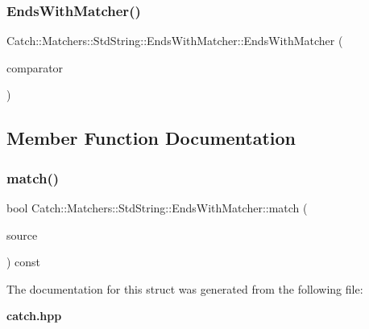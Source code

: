 \subsubsection{EndsWithMatcher()}
{\footnotesize\ttfamily Catch\+::\+Matchers\+::\+Std\+String\+::\+Ends\+With\+Matcher\+::\+Ends\+With\+Matcher (\begin{DoxyParamCaption}\item[{\textbf{ Cased\+String} const \&}]{comparator }\end{DoxyParamCaption})}



\subsection{Member Function Documentation}
\mbox{\label{struct_catch_1_1_matchers_1_1_std_string_1_1_ends_with_matcher_aca2741fa57374a2a98d2a84ac3e13a6d}} 
\subsubsection{match()}
{\footnotesize\ttfamily bool Catch\+::\+Matchers\+::\+Std\+String\+::\+Ends\+With\+Matcher\+::match (\begin{DoxyParamCaption}\item[{std\+::string const \&}]{source }\end{DoxyParamCaption}) const\hspace{0.3cm}{\ttfamily [override]}}



The documentation for this struct was generated from the following file\+:\begin{DoxyCompactItemize}
\item 
\textbf{ catch.\+hpp}\end{DoxyCompactItemize}
